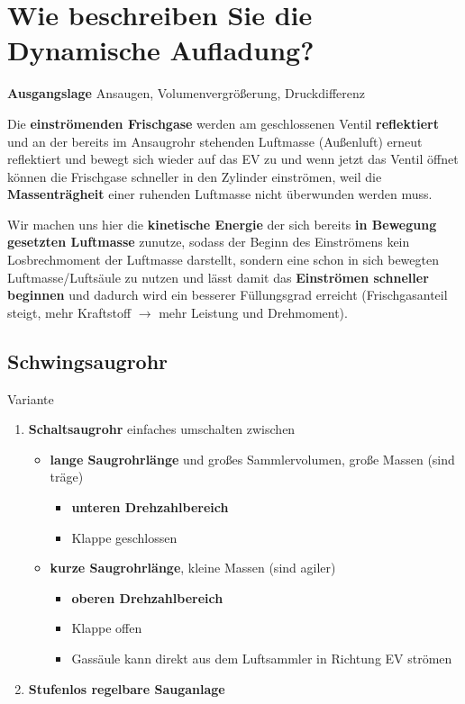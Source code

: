 \section{Wie beschreiben Sie die Dynamische
Aufladung?}\label{wie-beschreiben-sie-die-dynamische-aufladung}

\textbf{Ausgangslage} Ansaugen, Volumenvergrößerung, Druckdifferenz

Die \textbf{einströmenden Frischgase} werden am geschlossenen Ventil
\textbf{reflektiert} und an der bereits im Ansaugrohr stehenden
Luftmasse (Außenluft) erneut reflektiert und bewegt sich wieder auf das
EV zu und wenn jetzt das Ventil öffnet können die Frischgase schneller
in den Zylinder einströmen, weil die \textbf{Massenträgheit} einer
ruhenden Luftmasse nicht überwunden werden muss.

Wir machen uns hier die \textbf{kinetische Energie} der sich bereits
\textbf{in Bewegung gesetzten Luftmasse} zunutze, sodass der Beginn des
Einströmens kein Losbrechmoment der Luftmasse darstellt, sondern eine
schon in sich bewegten Luftmasse/Luftsäule zu nutzen und lässt damit das
\textbf{Einströmen schneller beginnen} und dadurch wird ein besserer
Füllungsgrad erreicht (Frischgasanteil steigt, mehr Kraftstoff $\to$
mehr Leistung und Drehmoment).

\subsection{Schwingsaugrohr}\label{schwingsaugrohr}

Variante

\begin{enumerate}
\item
  \textbf{Schaltsaugrohr} einfaches umschalten zwischen

  \begin{itemize}
  \item
    \textbf{lange Saugrohrlänge} und großes Sammlervolumen, große Massen
    (sind träge)

    \begin{itemize}
    \item
      \textbf{unteren Drehzahlbereich}
    \item
      Klappe geschlossen
    \end{itemize}
  \item
    \textbf{kurze Saugrohrlänge}, kleine Massen (sind agiler)

    \begin{itemize}
    \item
      \textbf{oberen Drehzahlbereich}
    \item
      Klappe offen
    \item
      Gassäule kann direkt aus dem Luftsammler in Richtung EV strömen
    \end{itemize}
  \end{itemize}
\item
  \textbf{Stufenlos regelbare Sauganlage}
\end{enumerate}


